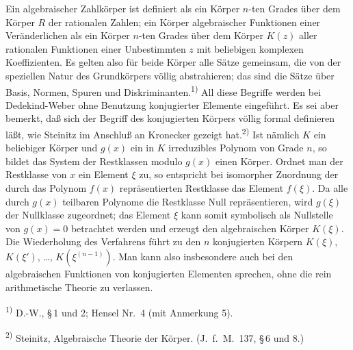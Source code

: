 \documentclass[12pt,a4paper]{article}
\begin{document}
Ein algebraischer Zahlk\"orper ist definiert als ein K\"orper $n$-ten Grades \"uber dem K\"orper $R$ der rationalen Zahlen; ein K\"orper algebraischer Funktionen einer Ver\"anderlichen als ein K\"orper $n$-ten Grades \"uber dem K\"orper $K(z)$ aller rationalen Funktionen einer Unbestimmten $z$ mit beliebigen komplexen Koeffizienten. Es gelten also f\"ur beide K\"orper alle S\"atze gemeinsam, die von der speziellen Natur des Grundk\"orpers v\"ollig abstrahieren; das sind die S\"atze \"uber Basis, Normen, Spuren und Diskriminanten.\textsuperscript{1)} All diese Begriffe werden bei Dedekind-Weber ohne Benutzung konjugierter Elemente eingef\"uhrt. Es sei aber bemerkt, da\ss{} sich der Begriff des konjugierten K\"orpers v\"ollig formal definieren l\"a\ss{}t, wie Steinitz im Anschlu\ss{} an Kronecker gezeigt hat.\textsuperscript{2)} Ist n\"amlich $K$ ein beliebiger K\"orper und $g(x)$ ein in $K$ irreduzibles Polynom von Grade $n$, so bildet das System der Restklassen modulo $g(x)$ einen K\"orper. Ordnet man der Restklasse von $x$ ein Element $\xi$ zu, so entspricht bei isomorpher Zuordnung der durch das Polynom $f(x)$ repr\"asentierten Restklasse das Element $f(\xi)$. Da alle durch $g(x)$ teilbaren Polynome die Restklasse Null repr\"asentieren, wird $g(\xi)$ der Nullklasse zugeordnet; das Element $\xi$ kann somit symbolisch als Nullstelle von $g(x)=0$ betrachtet werden und erzeugt den algebraischen K\"orper $K(\xi)$. Die Wiederholung des Verfahrens f\"uhrt zu den $n$ konjugierten K\"orpern $K(\xi)$, $K(\xi')$, \ldots, $K(\xi^{(n-1)})$. Man kann also insbesondere auch bei den algebraischen Funktionen von konjugierten Elementen sprechen, ohne die rein arithmetische Theorie zu verlassen.

\smallskip
\noindent\textsuperscript{1)} D.-W., \S\,1 und 2; Hensel Nr.\ 4 (mit Anmerkung 5).

\smallskip
\noindent\textsuperscript{2)} Steinitz, Algebraische Theorie der K\"orper. (J.\ f.\ M.\ 137, \S\,6 und 8.)
\end{document}
